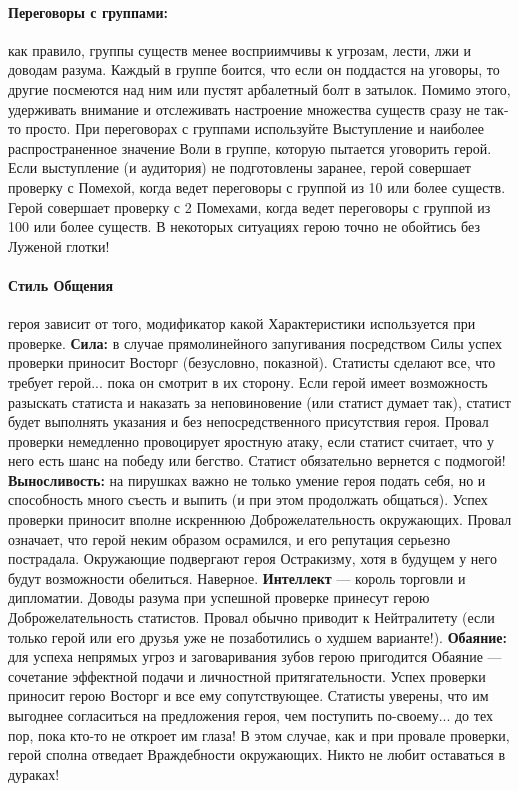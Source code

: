 \paragraph{Переговоры с группами:} как правило, группы существ менее восприимчивы к угрозам, лести, лжи и доводам разума. Каждый в группе боится, что если он поддастся на уговоры, то другие посмеются над ним или пустят арбалетный болт в затылок. Помимо этого, удерживать внимание и отслеживать настроение множества существ сразу не так-то просто. При переговорах с группами используйте Выступление и наиболее распространенное значение Воли в группе, которую пытается уговорить герой. Если выступление (и аудитория) не подготовлены заранее, герой совершает проверку с Помехой, когда ведет переговоры с группой из 10 или более существ. Герой совершает проверку с 2 Помехами, когда ведет переговоры с группой из 100 или более существ. В некоторых ситуациях герою точно не обойтись без Луженой глотки!

\paragraph{Стиль Общения} героя зависит от того, модификатор какой Характеристики используется при проверке.
\newline \textbf{Сила:} в случае прямолинейного запугивания посредством Силы успех проверки приносит Восторг (безусловно, показной). Статисты сделают все, что требует герой... пока он смотрит в их сторону. Если герой имеет возможность разыскать статиста и наказать за неповиновение (или статист думает так), статист будет выполнять указания и без непосредственного присутствия героя. Провал проверки немедленно провоцирует яростную атаку, если статист считает, что у него есть шанс на победу или бегство. Статист обязательно вернется с подмогой!
\newline \textbf{Выносливость:} на пирушках важно не только умение героя подать себя, но и способность много съесть и выпить (и при этом продолжать общаться). Успех проверки приносит вполне искреннюю Доброжелательность окружающих. Провал означает, что герой неким образом осрамился, и его репутация серьезно пострадала. Окружающие подвергают героя Остракизму, хотя в будущем у него будут возможности обелиться. Наверное.
\newline \textbf{Интеллект} — король торговли и дипломатии. Доводы разума при успешной проверке принесут герою Доброжелательность статистов. Провал обычно приводит к Нейтралитету (если только герой или его друзья уже не позаботились о худшем варианте!).
\newline \textbf{Обаяние:} для успеха непрямых угроз и заговаривания зубов герою пригодится Обаяние — сочетание эффектной подачи и личностной притягательности. Успех проверки приносит герою Восторг и все ему сопутствующее. Статисты уверены, что им выгоднее согласиться на предложения героя, чем поступить по-своему... до тех пор, пока кто-то не откроет им глаза! В этом случае, как и при провале проверки, герой сполна отведает Враждебности окружающих. Никто не любит оставаться в дураках!

